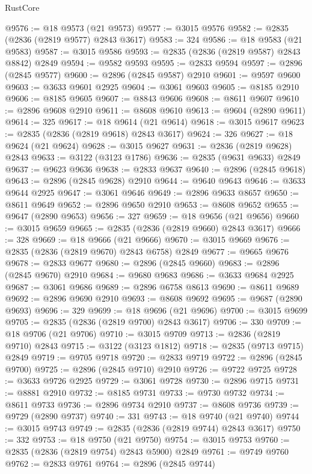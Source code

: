 \begin{lexlean}{RustCore}
\begin{coremodule}
@9576 := @18 @9573 (@21 @9573)
@9577 := @3015 @9576
@9582 := @2835 (@2836 (@2819 @9577) @2843 @3617)
@9583 := 324
@9586 := @18 @9583 (@21 @9583)
@9587 := @3015 @9586
@9593 := @2835 (@2836 (@2819 @9587) @2843 @8842) @2849
@9594 := @9582 @9593
@9595 := @2833 @9594
@9597 := @2896 (@2845 @9577)
@9600 := @2896 (@2845 @9587) @2910
@9601 := @9597 @9600
@9603 := @3633 @9601 @2925
@9604 := @3061 @9603
@9605 := @8185 @2910
@9606 := @8185 @9605
@9607 := @8843 @9606
@9608 := @8611 @9607
@9610 := @2896 @9608 @2910
@9611 := @8608 @9610
@9613 := @9604 (@2890 @9611)
@9614 := 325
@9617 := @18 @9614 (@21 @9614)
@9618 := @3015 @9617
@9623 := @2835 (@2836 (@2819 @9618) @2843 @3617)
@9624 := 326
@9627 := @18 @9624 (@21 @9624)
@9628 := @3015 @9627
@9631 := @2836 (@2819 @9628) @2843
@9633 := @3122 (@3123 @1786)
@9636 := @2835 (@9631 @9633) @2849
@9637 := @9623 @9636
@9638 := @2833 @9637
@9640 := @2896 (@2845 @9618)
@9643 := @2896 (@2845 @9628) @2910
@9644 := @9640 @9643
@9646 := @3633 @9644 @2925
@9647 := @3061 @9646
@9649 := @2896 @9633 @8657
@9650 := @8611 @9649
@9652 := @2896 @9650 @2910
@9653 := @8608 @9652
@9655 := @9647 (@2890 @9653)
@9656 := 327
@9659 := @18 @9656 (@21 @9656)
@9660 := @3015 @9659
@9665 := @2835 (@2836 (@2819 @9660) @2843 @3617)
@9666 := 328
@9669 := @18 @9666 (@21 @9666)
@9670 := @3015 @9669
@9676 := @2835 (@2836 (@2819 @9670) @2843 @6758) @2849
@9677 := @9665 @9676
@9678 := @2833 @9677
@9680 := @2896 (@2845 @9660)
@9683 := @2896 (@2845 @9670) @2910
@9684 := @9680 @9683
@9686 := @3633 @9684 @2925
@9687 := @3061 @9686
@9689 := @2896 @6758 @8613
@9690 := @8611 @9689
@9692 := @2896 @9690 @2910
@9693 := @8608 @9692
@9695 := @9687 (@2890 @9693)
@9696 := 329
@9699 := @18 @9696 (@21 @9696)
@9700 := @3015 @9699
@9705 := @2835 (@2836 (@2819 @9700) @2843 @3617)
@9706 := 330
@9709 := @18 @9706 (@21 @9706)
@9710 := @3015 @9709
@9713 := @2836 (@2819 @9710) @2843
@9715 := @3122 (@3123 @1812)
@9718 := @2835 (@9713 @9715) @2849
@9719 := @9705 @9718
@9720 := @2833 @9719
@9722 := @2896 (@2845 @9700)
@9725 := @2896 (@2845 @9710) @2910
@9726 := @9722 @9725
@9728 := @3633 @9726 @2925
@9729 := @3061 @9728
@9730 := @2896 @9715
@9731 := @8881 @2910
@9732 := @8185 @9731
@9733 := @9730 @9732
@9734 := @8611 @9733
@9736 := @2896 @9734 @2910
@9737 := @8608 @9736
@9739 := @9729 (@2890 @9737)
@9740 := 331
@9743 := @18 @9740 (@21 @9740)
@9744 := @3015 @9743
@9749 := @2835 (@2836 (@2819 @9744) @2843 @3617)
@9750 := 332
@9753 := @18 @9750 (@21 @9750)
@9754 := @3015 @9753
@9760 := @2835 (@2836 (@2819 @9754) @2843 @5900) @2849
@9761 := @9749 @9760
@9762 := @2833 @9761
@9764 := @2896 (@2845 @9744)

\end{coremodule}
\end{lexlean}
